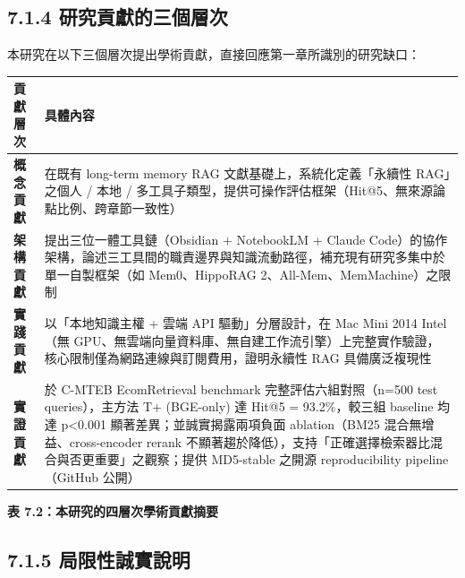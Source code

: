 \subsection{7.1.4
研究貢獻的三個層次}\label{ux7814ux7a76ux8ca2ux737bux7684ux4e09ux500bux5c64ux6b21}

本研究在以下三個層次提出學術貢獻，直接回應第一章所識別的研究缺口：

{\def\LTcaptype{none} %
\begin{longtable}[]{@{}
  >{\raggedright\arraybackslash}p{}
  >{\raggedright\arraybackslash}p{}@{}}
\toprule\noalign{}
\begin{minipage}[b]{\linewidth}\raggedright
貢獻層次
\end{minipage} & \begin{minipage}[b]{\linewidth}\raggedright
具體內容
\end{minipage} \\
\midrule\noalign{}
\endhead
\bottomrule\noalign{}
\endlastfoot
\textbf{概念貢獻} & 在既有 long-term memory RAG
文獻基礎上，系統化定義「永續性 RAG」之個人 / 本地 /
多工具子類型，提供可操作評估框架（Hit@5、無來源論點比例、跨章節一致性） \\
\textbf{架構貢獻} & 提出三位一體工具鏈（Obsidian + NotebookLM + Claude
Code）的協作架構，論述三工具間的職責邊界與知識流動路徑，補充現有研究多集中於單一自製框架（如
Mem0、HippoRAG 2、All-Mem、MemMachine）之限制 \\
\textbf{實踐貢獻} & 以「本地知識主權 + 雲端 API 驅動」分層設計，在 Mac
Mini 2014 Intel（無
GPU、無雲端向量資料庫、無自建工作流引擎）上完整實作驗證，核心限制僅為網路連線與訂閱費用，證明永續性
RAG 具備廣泛複現性 \\
\textbf{實證貢獻} & 於 C-MTEB EcomRetrieval benchmark 完整評估六組對照（n=500
test queries），主方法 T+ (BGE-only) 達 Hit@5 = 93.2\%，較三組 baseline
均達 p<0.001 顯著差異；並誠實揭露兩項負面 ablation（BM25 混合無增益、cross-encoder
rerank 不顯著趨於降低），支持「正確選擇檢索器比混合與否更重要」之觀察；提供 MD5-stable
之開源 reproducibility pipeline（GitHub 公開） \\
\end{longtable}
}

\textbf{表 7.2：本研究的四層次學術貢獻摘要}

\subsection{7.1.5
局限性誠實說明}\label{ux5c40ux9650ux6027ux8aa0ux5be6ux8aaaux660e}

